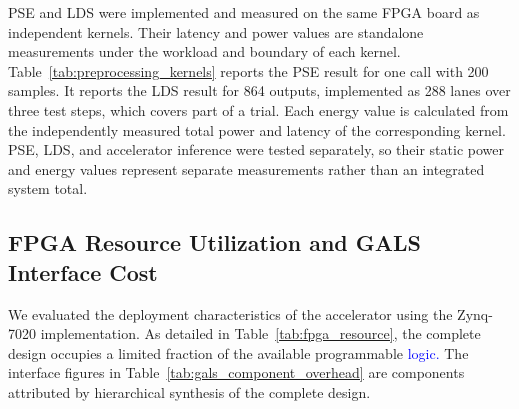 \documentclass[12pt]{article}
\newcommand{\rev}[1]{\textcolor{blue}{#1}}
\begin{document}
PSE and LDS were implemented and measured on the same FPGA board as independent kernels. Their latency and power values are standalone measurements under the workload and boundary of each kernel. Table~\ref{tab:preprocessing_kernels} reports the PSE result for one call with 200 samples. It reports the LDS result for 864 outputs, implemented as 288 lanes over three test steps, which covers part of a trial. Each energy value is calculated from the independently measured total power and latency of the corresponding kernel. PSE, LDS, and accelerator inference were tested separately, so their static power and energy values represent separate measurements rather than an integrated system total.

\begin{table}[!htbp]
\centering
\caption{\rev{Standalone FPGA measurements} of preprocessing kernels at board level. PSE, LDS, and the GALS accelerator were tested independently, and each power and energy value retains its own measurement \rev{boundary.} Power components were rounded \rev{independently.}}
 \label{tab:preprocessing_kernels}
\scriptsize
\renewcommand{\arraystretch}{1.15}
\setlength{\tabcolsep}{2.3pt}
\end{table}

\subsection{FPGA Resource Utilization and GALS Interface Cost}

We evaluated the deployment characteristics of the accelerator using the Zynq-7020 implementation. As detailed in Table~\ref{tab:fpga_resource}, the complete design occupies a limited fraction of the available programmable \rev{logic.} The interface figures in Table~\ref{tab:gals_component_overhead} are components attributed by hierarchical synthesis of the complete design.
\end{document}
